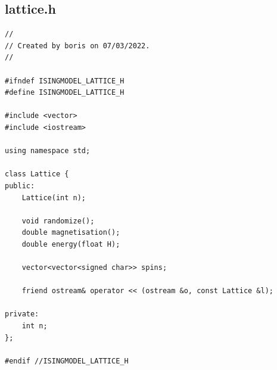 \documentclass[a4paper, 12pt]{article}
\begin{document}
\subsection{lattice.h}
\begin{lstlisting}
//
// Created by boris on 07/03/2022.
//

#ifndef ISINGMODEL_LATTICE_H
#define ISINGMODEL_LATTICE_H

#include <vector>
#include <iostream>

using namespace std;

class Lattice {
public:
    Lattice(int n);

    void randomize();
    double magnetisation();
    double energy(float H);

    vector<vector<signed char>> spins;

    friend ostream& operator << (ostream &o, const Lattice &l);

private:
    int n;
};

#endif //ISINGMODEL_LATTICE_H
\end{lstlisting}
    
 \newpage
\end{document}
